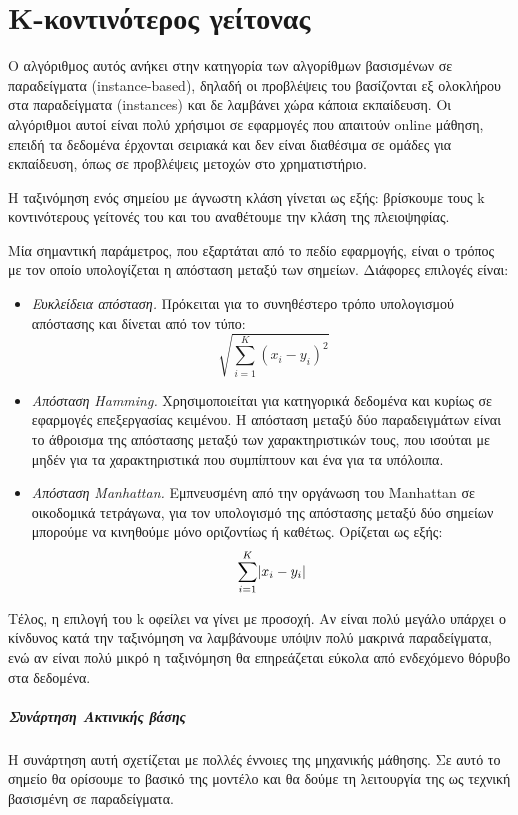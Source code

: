 \chapter{Κ-κοντινότερος γείτονας}
\label{appendix:knn}
Ο αλγόριθμος αυτός ανήκει στην κατηγορία των αλγορίθμων βασισμένων σε παραδείγματα (instance-based), δηλαδή οι προβλέψεις του βασίζονται εξ ολοκλήρου στα παραδείγματα (instan\-ces) και δε λαμβάνει χώρα κάποια εκπαίδευση. Οι αλγόριθμοι αυτοί είναι πολύ χρήσιμοι σε εφαρμογές που απαιτούν online μάθηση, επειδή τα δεδομένα έρχονται σειριακά και δεν είναι διαθέσιμα σε ομάδες για εκπαίδευση, όπως σε προβλέψεις μετοχών στο χρηματιστήριο.

Η ταξινόμηση ενός σημείου με άγνωστη κλάση γίνεται ως εξής: βρίσκουμε τους k κοντινότερους γείτονές του και του αναθέτουμε την κλάση της πλειοψηφίας.

Μία σημαντική παράμετρος, που εξαρτάται από το πεδίο εφαρμογής, είναι ο τρόπος με τον οποίο υπολογίζεται η απόσταση μεταξύ των σημείων. Διάφορες επιλογές είναι:
\begin{itemize}
	\item \textit{Ευκλείδεια απόσταση.} Πρόκειται για το συνηθέστερο τρόπο υπολογισμού απόστασης και δίνεται από τον τύπο:
	\begin{equation}
	\sqrt[]{\sum_{i=1}^{K} (x_i - y_i )^2}
	\end{equation}
	\item \textit{Απόσταση Hamming.} Χρησιμοποιείται για κατηγορικά δεδομένα και κυρίως σε εφαρμογές επεξεργασίας κειμένου. Η απόσταση μεταξύ δύο παραδειγμάτων είναι το άθροισμα της απόστασης μεταξύ των χαρακτηριστικών τους, που ισούται με μηδέν για τα χαρακτηριστικά που συμπίπτουν και ένα για τα υπόλοιπα.
	\item \textit{Απόσταση Manhattan.} Εμπνευσμένη από την οργάνωση του Manhattan σε οικοδομικά τετράγωνα, για τον υπολογισμό της απόστασης μεταξύ δύο σημείων μπορούμε να κινηθούμε μόνο οριζοντίως ή καθέτως. Ορίζεται ως εξής:
	\begin{equation}
	\sum_{i=1}^{K} \lvert x_i - y_i\rvert
	\end{equation}
\end{itemize}

Τέλος, η επιλογή του k οφείλει να γίνει με προσοχή. Αν είναι πολύ μεγάλο υπάρχει ο κίνδυνος κατά την ταξινόμηση να λαμβάνουμε υπόψιν πολύ μακρινά παραδείγματα, ενώ αν είναι πολύ μικρό η ταξινόμηση θα επηρεάζεται εύκολα από ενδεχόμενο θόρυβο στα δεδομένα.
\paragraph{Συνάρτηση Ακτινικής βάσης }
Η συνάρτηση αυτή σχετίζεται με πολλές έννοιες της μηχανικής μάθησης. Σε αυτό το σημείο θα ορίσουμε το βασικό της μοντέλο και θα δούμε τη λειτουργία της ως τεχνική βασισμένη σε παραδείγματα. 

